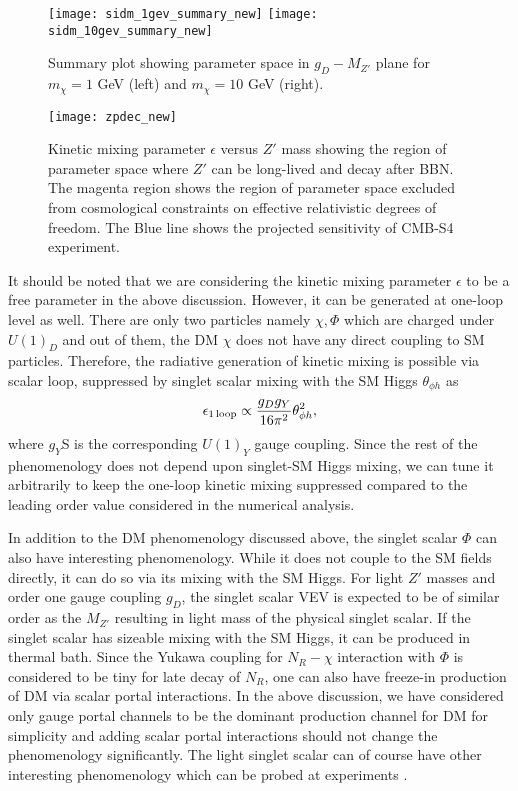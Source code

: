 \documentclass[prd,nofootinbib,preprint,superscriptaddress]{revtex4}
\begin{document}
\begin{figure}[h!]
	\centering
	\texttt{[image: sidm\_1gev\_summary\_new]}
	\hfil
	\texttt{[image: sidm\_10gev\_summary\_new]}
	\caption{Summary plot showing parameter space in $g_D-M_{Z'}$ plane for $m_{\chi}=1$ GeV (left) and $m_{\chi}=10$ GeV (right).}
	\label{summary10}
\end{figure}

\begin{figure}[h!]
	\centering
	\texttt{[image: zpdec\_new]}
	\caption{Kinetic mixing parameter $\epsilon$ versus $Z'$ mass showing the region of parameter space where $Z'$ can be long-lived and decay after BBN. The magenta region shows the region of parameter space excluded from cosmological constraints on effective relativistic degrees of freedom. The Blue line shows the projected sensitivity of CMB-S4 experiment\cite{CMB-S4:2016ple,Ibe:2019gpv}.}
	\label{summary10a}
\end{figure}

It should be noted that we are considering the kinetic mixing parameter $\epsilon$ to be a free parameter in the above discussion. However, it can be generated at one-loop level as well. There are only two particles namely $\chi, \Phi$ which are charged under $U(1)_D$ and out of them, the DM $\chi$ does not have any direct coupling to SM particles. Therefore, the radiative generation of kinetic mixing is possible via scalar loop, suppressed by singlet scalar mixing with the SM Higgs $\theta_{\phi h}$ as \cite{Cheung:2009qd, Mambrini:2011dw}
\begin{equation}
    \epsilon_{\rm 1\, loop} \propto \frac{g_D g_Y}{16\pi^2} \theta^2_{\phi h},
\end{equation}
where $g_Y$S is the corresponding $U(1)_Y$ gauge coupling. Since the rest of the phenomenology does not depend upon singlet-SM Higgs mixing, we can tune it arbitrarily to keep the one-loop kinetic mixing suppressed compared to the leading order value considered in the numerical analysis.

In addition to the DM phenomenology discussed above, the singlet scalar $\Phi$ can also have interesting phenomenology. While it does not couple to the SM fields directly, it can do so via its mixing with the SM Higgs. For light $Z'$ masses and order one gauge coupling $g_D$, the singlet scalar VEV is expected to be of similar order as the $M_{Z'}$ resulting in light mass of the physical singlet scalar. If the singlet scalar has sizeable mixing with the SM Higgs, it can be produced in thermal bath. Since the Yukawa coupling for $N_R-\chi$ interaction with $\Phi$ is considered to be tiny for late decay of $N_R$, one can also have freeze-in production of DM via scalar portal interactions. In the above discussion, we have considered only gauge portal channels to be the dominant production channel for DM for simplicity and adding scalar portal interactions should not change the phenomenology significantly. The light singlet scalar can of course have other interesting phenomenology which can be probed at experiments \cite{Clarke:2013aya}.
\end{document}
